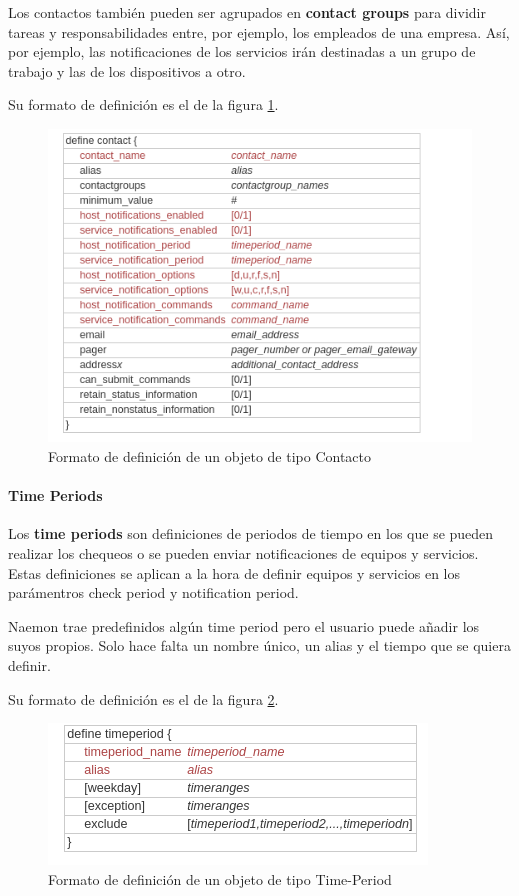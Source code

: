 Los contactos también pueden ser agrupados en \textbf{contact groups} para dividir tareas y responsabilidades entre, por ejemplo, los empleados de una empresa. Así, por ejemplo, las notificaciones de los servicios irán destinadas a un grupo de trabajo y las de los dispositivos a otro.

Su formato de definición es el de la figura \ref{define-contact}. 
\begin{figure}[H]
	\centering
	\includegraphics[scale=0.7]{imagenes/definicion_objetos/contact.png}
	\caption{Formato de definición de un objeto de tipo Contacto} \label{define-contact}
	
\end{figure}

\paragraph{Time Periods}

Los \textbf{time periods} son definiciones de periodos de tiempo en los que se pueden realizar los chequeos o se pueden enviar notificaciones de equipos y servicios. Estas definiciones se aplican a la hora de definir equipos y servicios en los parámentros check period y notification period.

Naemon trae predefinidos algún time period pero el usuario puede añadir los suyos propios. Solo hace falta un nombre único, un alias y el tiempo que se quiera definir.

Su formato de definición es el de la figura \ref{time-period}. 


\begin{figure}[H]
	\centering
	\includegraphics[scale=0.7]{imagenes/definicion_objetos/time_period.png}
	\caption{Formato de definición de un objeto de tipo Time-Period} \label{time-period}	
\end{figure}

